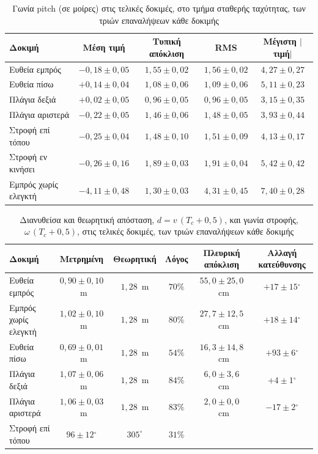 \begin{table}[htbp]
    \centering
    \small
    \begin{tabular}{@{}l c c c c@{}}
        \toprule
        Δοκιμή & Μέση τιμή & Τυπική απόκλιση & RMS & Μέγιστη $|$τιμή$|$ \\
        \midrule
        Ευθεία εμπρός & $-0{,}18 \pm 0{,}05$ & $1{,}55 \pm 0{,}02$ & $1{,}56 \pm 0{,}02$ & $4{,}27 \pm 0{,}27$ \\
        Ευθεία πίσω & $+0{,}14 \pm 0{,}04$ & $1{,}08 \pm 0{,}06$ & $1{,}09 \pm 0{,}06$ & $5{,}11 \pm 0{,}23$ \\
        Πλάγια δεξιά & $+0{,}02 \pm 0{,}05$ & $0{,}96 \pm 0{,}05$ & $0{,}96 \pm 0{,}05$ & $3{,}15 \pm 0{,}35$ \\
        Πλάγια αριστερά & $-0{,}22 \pm 0{,}05$ & $1{,}46 \pm 0{,}06$ & $1{,}48 \pm 0{,}05$ & $3{,}93 \pm 0{,}44$ \\
        Στροφή επί τόπου & $-0{,}25 \pm 0{,}04$ & $1{,}48 \pm 0{,}10$ & $1{,}51 \pm 0{,}09$ & $4{,}13 \pm 0{,}17$ \\
        Στροφή εν κινήσει & $-0{,}26 \pm 0{,}16$ & $1{,}89 \pm 0{,}03$ & $1{,}91 \pm 0{,}04$ & $5{,}42 \pm 0{,}42$ \\
        Εμπρός χωρίς ελεγκτή & $-4{,}11 \pm 0{,}48$ & $1{,}30 \pm 0{,}03$ & $4{,}31 \pm 0{,}45$ & $7{,}40 \pm 0{,}28$ \\
        \bottomrule
    \end{tabular}
    \caption[Γωνία pitch στις τελικές δοκιμές]{Γωνία pitch (σε μοίρες) στις τελικές δοκιμές, στο τμήμα σταθερής ταχύτητας, των τριών επαναλήψεων κάθε δοκιμής}
    \label{tab:final-pitch}
\end{table}

\begin{table}[htbp]
    \centering
    \small
    \begin{tabular}{@{}l c c c c c@{}}
        \toprule
        Δοκιμή & Μετρημένη & Θεωρητική & Λόγος & Πλευρική απόκλιση & Αλλαγή κατεύθυνσης \\
        \midrule
        Ευθεία εμπρός & $0{,}90 \pm 0{,}10$~m & $1{,}28$~m & $70\%$ & $55{,}0 \pm 25{,}0$~cm & $+17 \pm 15$$^\circ$ \\
        Εμπρός χωρίς ελεγκτή & $1{,}02 \pm 0{,}10$~m & $1{,}28$~m & $80\%$ & $27{,}7 \pm 12{,}5$~cm & $+18 \pm 14$$^\circ$ \\
        Ευθεία πίσω & $0{,}69 \pm 0{,}01$~m & $1{,}28$~m & $54\%$ & $16{,}3 \pm 14{,}8$~cm & $+93 \pm 6$$^\circ$ \\
        Πλάγια δεξιά & $1{,}07 \pm 0{,}06$~m & $1{,}28$~m & $84\%$ & $6{,}0 \pm 3{,}6$~cm & $+4 \pm 1$$^\circ$ \\
        Πλάγια αριστερά & $1{,}06 \pm 0{,}03$~m & $1{,}28$~m & $83\%$ & $2{,}0 \pm 0{,}0$~cm & $-17 \pm 2$$^\circ$ \\
        Στροφή επί τόπου & $96 \pm 12$$^\circ$ & $305^\circ$ & $31\%$ & & \\
        \bottomrule
    \end{tabular}
    \caption[Διανυθείσα απόσταση και γωνία στροφής στις τελικές δοκιμές]{Διανυθείσα και θεωρητική απόσταση, $d = v\,(T_c + 0{,}5)$, και γωνία στροφής, $\omega\,(T_c + 0{,}5)$, στις τελικές δοκιμές, των τριών επαναλήψεων κάθε δοκιμής}
    \label{tab:final-distance}
\end{table}
